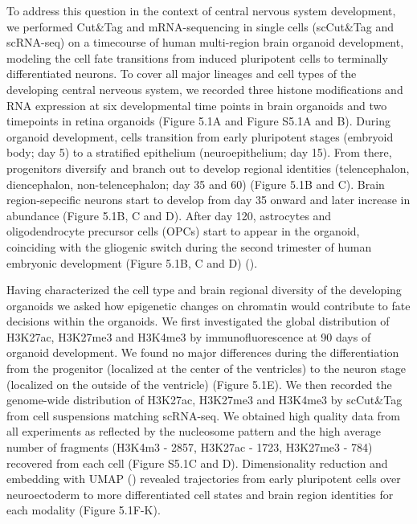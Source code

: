 To address this question in the context of central nervous system development, we performed Cut\&Tag and mRNA-sequencing in single cells (scCut\&Tag and scRNA-seq) on a timecourse of human multi-region brain organoid development, modeling the cell fate transitions from induced pluripotent cells to terminally differentiated neurons. To cover all major lineages and cell types of the developing central nerveous system, we recorded three histone modifications and RNA expression at six developmental time points in brain organoids and two timepoints in retina organoids (Figure 5.1A and Figure S5.1A and B). During organoid development, cells transition from early pluripotent stages (embryoid body; day 5) to a stratified epithelium (neuroepithelium; day 15). From there, progenitors diversify and branch out to develop regional identities (telencephalon, diencephalon, non-telencephalon; day 35 and 60) (Figure 5.1B and C). Brain region-sepecific neurons start to develop from day 35 onward and later increase in abundance (Figure 5.1B, C and D). After day 120, astrocytes and oligodendrocyte precursor cells (OPCs) start to appear in the organoid, coinciding with the gliogenic switch during the second trimester of human embryonic development (Figure 5.1B, C and D) (\cite{rowitch_developmental_2010}). 

Having characterized the cell type and brain regional diversity of the developing organoids we asked how epigenetic changes on chromatin would contribute to fate decisions within the organoids. We first investigated the global distribution of H3K27ac, H3K27me3 and H3K4me3 by immunofluorescence at 90 days of organoid development. We found no major differences during the differentiation from the progenitor (localized at the center of the ventricles) to the neuron stage (localized on the outside of the ventricle) (Figure 5.1E). We then recorded the genome-wide distribution of H3K27ac, H3K27me3 and H3K4me3 by scCut\&Tag from cell suspensions matching scRNA-seq. We obtained high quality data from all experiments as reflected by the nucleosome pattern and the high average number of fragments (H3K4m3 - 2857, H3K27ac - 1723, H3K27me3 - 784) recovered from each cell (Figure S5.1C and D). Dimensionality reduction and embedding with UMAP (\cite{mcinnes_umap_2018}) revealed trajectories from early pluripotent cells over neuroectoderm to more differentiated cell states and brain region identities for each modality (Figure 5.1F-K).

